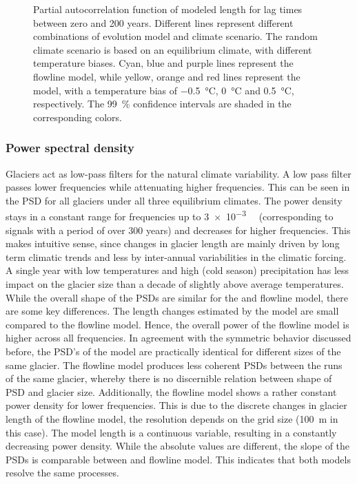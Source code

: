 \begin{figure}[htp]
        \caption{Partial autocorrelation function of modeled length for lag times between zero and 200 years. Different lines represent different combinations of evolution model and climate scenario.
        The random climate scenario is based on an equilibrium climate, with different temperature biases.
        Cyan, blue and purple lines represent the flowline model, while yellow, orange and red lines represent the \vas{} model, with a temperature bias of \SI{-.5}{\celsius}, \SI{0}{\celsius} and \SI{+.5}{\celsius}, respectively.
        The \SI{99}{\percent} confidence intervals are shaded in the corresponding colors.}
        \label{fig:pacf}
      \end{figure}


    \subsubsection{Power spectral density} %
    \label{ssub:power_spectral_density_results}

      Glaciers act as low-pass filters for the natural climate variability. A low pass filter passes lower frequencies while attenuating higher frequencies. This can be seen in the PSD for all glaciers under all three equilibrium climates. The power density stays in a constant range for frequencies up to \SI{3e-3}{\per\year} (corresponding to signals with a period of over 300 years) and decreases for higher frequencies. This makes intuitive sense, since changes in glacier length are mainly driven by long term climatic trends and less by inter-annual variabilities in the climatic forcing. A single year with low temperatures and high (cold season) precipitation has less impact on the glacier size than a decade of slightly above average temperatures.
      While the overall shape of the PSDs are similar for the \vas{} and flowline model, there are some key differences. The length changes estimated by the \vas{} model are small compared to the flowline model. Hence, the overall power of the flowline model is higher across all frequencies. In agreement with the symmetric behavior discussed before, the PSD's of the \vas{} model are practically identical for different sizes of the same glacier. The flowline model produces less coherent PSDs between the runs of the same glacier, whereby there is no discernible relation between shape of PSD and glacier size.
      Additionally, the flowline model shows a rather constant power density for lower frequencies. This is due to the discrete changes in glacier length of the flowline model, the resolution depends on the grid size (\SI{100}{\meter} in this case). The \vas{} model length is a continuous variable, resulting in a constantly decreasing power density.
      While the absolute values are different, the slope of the PSDs is comparable between \vas{} and flowline model. This indicates that both models resolve the same processes.

